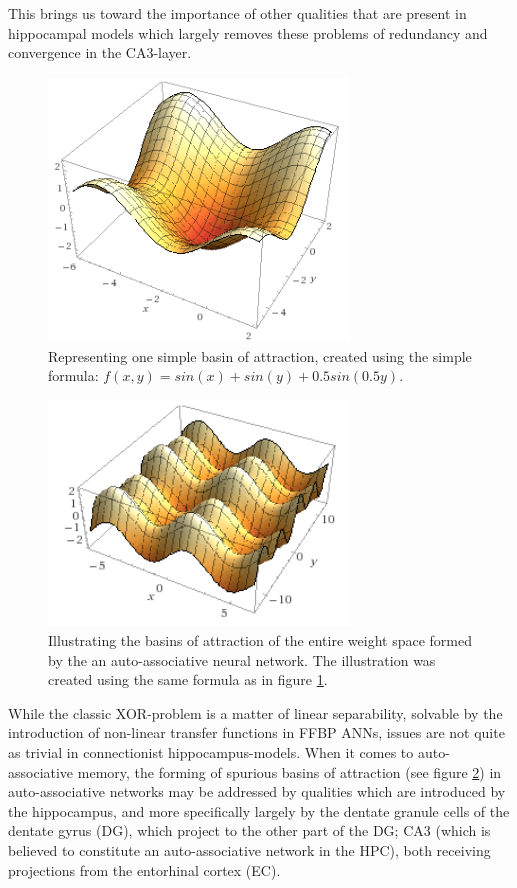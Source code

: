 This brings us toward the importance of other qualities that are present in hippocampal models which largely removes these problems of redundancy and convergence in the CA3-layer.

\begin{figure}
    \centering
    \includegraphics[width=8cm]{fig/simple-basin.png}
    \caption{Representing one simple basin of attraction, created using the simple formula: $f(x,y) = sin(x) + sin(y) + 0.5 sin(0.5 y)$.}
    \label{fig:simple-basin}
\end{figure}

\begin{figure}
    \centering
    \includegraphics[width=8cm]{fig/whole-view-simple-basins.png}
    \caption{Illustrating the basins of attraction of the entire weight space formed by the an auto-associative neural network. The illustration was created using the same formula as in figure \ref{fig:simple-basin}.}
    \label{fig:basins-of-attraction}
\end{figure}

While the classic XOR-problem is a matter of linear separability, solvable by the introduction of non-linear transfer functions in FFBP ANNs, issues are not quite as trivial in connectionist hippocampus-models. When it comes to auto-associative memory, the forming of spurious basins of attraction (see figure \ref{fig:basins-of-attraction}) in auto-associative networks may be addressed by qualities which are introduced by the hippocampus, and more specifically largely by the dentate granule cells of the dentate gyrus (DG), which project to the other part of the DG; CA3 (which is believed to constitute an auto-associative network in the HPC), both receiving projections from the entorhinal cortex (EC).

